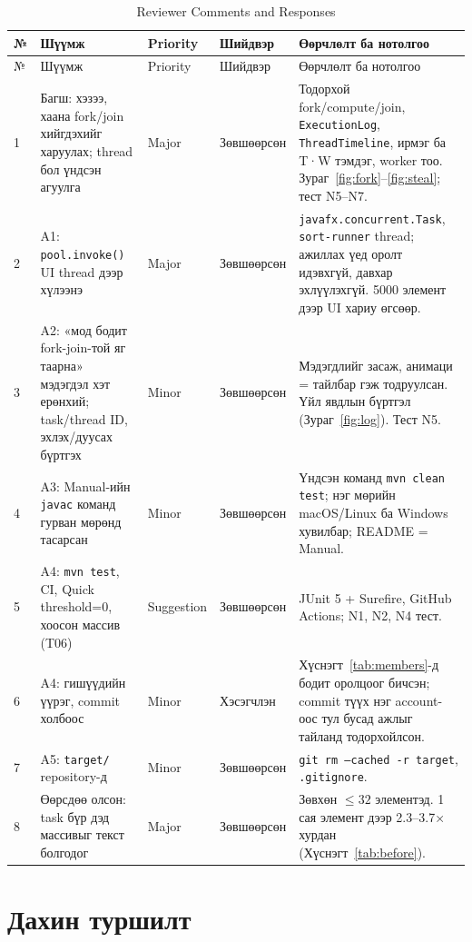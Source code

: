 \documentclass[11pt,a4paper]{article}
\begin{document}
{\small
\begin{longtable}{@{}p{0.4cm}p{4.1cm}p{1.5cm}p{1.6cm}p{6.8cm}@{}}
\caption{Reviewer Comments and Responses}\label{tab:resp}\\
\toprule
№ & Шүүмж & Priority & Шийдвэр & Өөрчлөлт ба нотолгоо \\
\midrule
\endfirsthead
\toprule
№ & Шүүмж & Priority & Шийдвэр & Өөрчлөлт ба нотолгоо \\
\midrule
\endhead
1 & Багш: хэзээ, хаана fork/join хийгдэхийг харуулах; thread бол үндсэн агуулга & Major & Зөвшөөрсөн &
  Тодорхой fork/compute/join, \texttt{ExecutionLog}, \texttt{ThreadTimeline}, ирмэг ба T·W тэмдэг, worker тоо. Зураг~\ref{fig:fork}--\ref{fig:steal}; тест N5--N7. \\
2 & A1: \texttt{pool.invoke()} UI thread дээр хүлээнэ & Major & Зөвшөөрсөн &
  \texttt{javafx.concurrent.Task}, \texttt{sort-runner} thread; ажиллах үед оролт идэвхгүй, давхар эхлүүлэхгүй. 5000 элемент дээр UI хариу өгсөөр. \\
3 & A2: «мод бодит fork-join-той яг таарна» мэдэгдэл хэт ерөнхий; task/thread ID, эхлэх/дуусах бүртгэх & Minor & Зөвшөөрсөн &
  Мэдэгдлийг засаж, анимаци = тайлбар гэж тодруулсан. Үйл явдлын бүртгэл (Зураг~\ref{fig:log}). Тест N5. \\
4 & A3: Manual-ийн \texttt{javac} команд гурван мөрөнд тасарсан & Minor & Зөвшөөрсөн &
  Үндсэн команд \texttt{mvn clean test}; нэг мөрийн macOS/Linux ба Windows хувилбар; README = Manual. \\
5 & A4: \texttt{mvn test}, CI, Quick threshold=0, хоосон массив (T06) & Suggestion & Зөвшөөрсөн &
  JUnit 5 + Surefire, GitHub Actions; N1, N2, N4 тест. \\
6 & A4: гишүүдийн үүрэг, commit холбоос & Minor & Хэсэгчлэн &
  Хүснэгт~\ref{tab:members}-д бодит оролцоог бичсэн; commit түүх нэг account-оос тул бусад ажлыг тайланд тодорхойлсон. \\
7 & A5: \texttt{target/} repository-д & Minor & Зөвшөөрсөн &
  \texttt{git rm --cached -r target}, \texttt{.gitignore}. \\
8 & Өөрсдөө олсон: task бүр дэд массивыг текст болгодог & Major & Зөвшөөрсөн &
  Зөвхөн $\le 32$ элементэд. 1 сая элемент дээр 2.3--3.7× хурдан (Хүснэгт~\ref{tab:before}). \\
\bottomrule
\end{longtable}
}

\section{Дахин туршилт}
\end{document}
